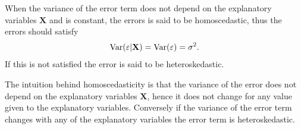 \begin{definition}
When the variance of the error term does not depend on the explanatory variables $\mathbf{X}$ and is constant, the errors is said to be homoscedastic, thus the errors should satisfy
\begin{align*}
    \operatorname{\text{Var}}(\varepsilon | \mathbf{X}) = \operatorname{\text{Var}}(\varepsilon) = \sigma^2.
\end{align*}
If this is not satisfied the error is said to be heteroskedastic. 
\end{definition}
The intuition behind homoscedasticity is that the variance of the error does not depend on the explanatory variables $\mathbf{X}$, hence it does not change for any value given to the explanatory variables. Conversely if the variance of the error term changes with any of the explanatory variables the error term is heteroskedastic. 

